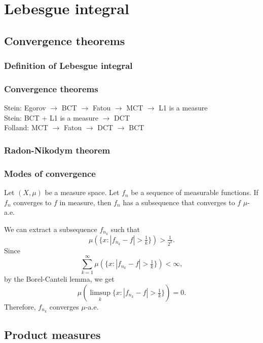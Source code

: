 \documentclass{../note}
\begin{document}
\part{Lebesgue integral}


\chapter{Convergence theorems}
\section{Definition of Lebesgue integral}
\section{Convergence theorems}

Stein: Egorov $\to$ BCT $\to$ Fatou $\to$ MCT $\to$ L1 is a measure\\
Stein: BCT + L1 is a measure $\to$ DCT\\
Folland: MCT $\to$ Fatou $\to$ DCT $\to$ BCT





\section{Radon-Nikodym theorem}


\section{Modes of convergence}

\begin{prb}
Let $(X,\mu)$ be a measure space.
Let $f_n$ be a sequence of measurable functions.
If $f_n$ converges to $f$ in measure, then $f_n$ has a subsequence that converges to $f$ $\mu$-a.e.
\end{prb}
\begin{pf}
We can extract a subsequence $f_{n_k}$ such that
\[\mu(\{x:|f_{n_k}-f|>\tfrac1k\})>\tfrac1{2^k}.\]
Since
\[\sum_{k=1}^\infty\mu(\{x:|f_{n_k}-f|>\tfrac1k\})<\infty,\]
by the Borel-Canteli lemma, we get
\[\mu(\limsup_k\{x:|f_{n_k}-f|>\tfrac1k\})=0.\]
Therefore, $f_{n_k}$ converges $\mu$-a.e.
\end{pf}


\chapter{Product measures}
\end{document}
